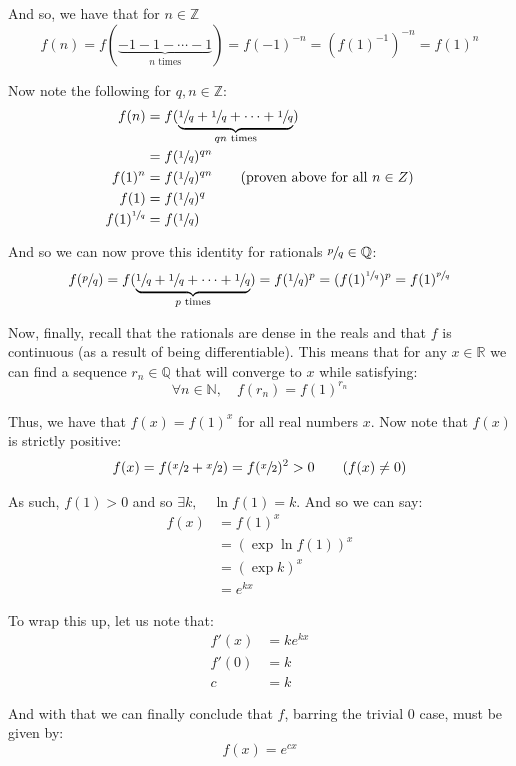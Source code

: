 \documentclass{article}
\newcommand{\R}{\mathbb R}
\newcommand{\Q}{\mathbb Q}
\newcommand{\Z}{\mathbb Z}
\newcommand{\N}{\mathbb N}
\begin{document}
And so, we have that for $n\in\Z$
$$f(n)=f(\underbrace{-1-1-\cdots-1}_{n\text{ times}})=f(-1)^{-n}=(f(1)^{-1})^{-n}=f(1)^{n}$$

Now note the following for $q,n\in\Z$:
\begin{align*}
  f(n)&=f(\underbrace{\sfrac{1}{q}+\sfrac{1}{q}+\cdots+\sfrac{1}{q}}_{qn\text{ times}})\\
  &=f(\sfrac{1}{q})^{qn}\\
  f(1)^n&=f(\sfrac{1}{q})^{qn}\tag{proven above for all $n\in Z$}\\
  f(1)&=f(\sfrac{1}{q})^q\\
  f(1)^{\sfrac{1}{q}}&=f(\sfrac{1}{q})
\end{align*}

And so we can now prove this identity for rationals $\sfrac{p}{q}\in\Q$:
$$f(\sfrac{p}{q})=f(\underbrace{\sfrac{1}{q}+\sfrac{1}{q}+\cdots+\sfrac{1}{q}}_{p\text{ times}})=f(\sfrac{1}{q})^p=(f(1)^{\sfrac{1}{q}})^p=f(1)^{\sfrac{p}{q}}$$

Now, finally, recall that the rationals are dense in the reals and that $f$ is continuous (as a result of being differentiable). This means that for any $x\in\R$ we can find a sequence $r_n\in\Q$ that will converge to $x$ while satisfying:
$$\forall n\in\N,\quad f(r_n)=f(1)^{r_n}$$

Thus, we have that $f(x)=f(1)^x$ for all real numbers $x$. Now note that $f(x)$ is strictly positive:
\begin{align*}
  f(x)=f(\sfrac{x}{2}+\sfrac{x}{2})=f(\sfrac{x}{2})^2>0\tag{$f(x)\not=0$}
\end{align*}

As such, $f(1)>0$ and so $\exists k,\quad \ln f(1)=k$. And so we can say:
\begin{align*}
  f(x)&=f(1)^x\tag{we proved this for all reals}\\
  &=(\exp\ln f(1))^x\tag{$\exp\ln f(x)=f(x)$}\\
  &=(\exp k)^x\\
  &=e^{kx}
\end{align*}

To wrap this up, let us note that:
\begin{align*}
  f'(x)&=ke^{kx}\\
  f'(0)&=k\\
  c&=k\tag{def. of $c$}
\end{align*}

And with that we can finally conclude that $f$, barring the trivial 0 case, must be given by:
$$f(x)=e^{cx}$$
\end{document}
